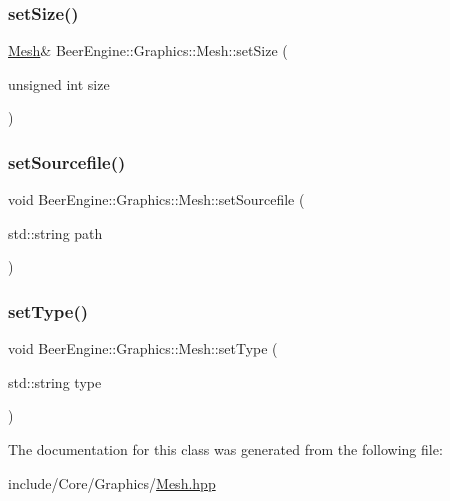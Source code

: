 \subsubsection{\texorpdfstring{set\+Size()}{setSize()}}
{\footnotesize\ttfamily \mbox{\hyperlink{class_beer_engine_1_1_graphics_1_1_mesh}{Mesh}}\& Beer\+Engine\+::\+Graphics\+::\+Mesh\+::set\+Size (\begin{DoxyParamCaption}\item[{unsigned int}]{size }\end{DoxyParamCaption})}

\mbox{\label{class_beer_engine_1_1_graphics_1_1_mesh_a9c0d91380cd84b6850e850ed9b4d61ed}} 
\subsubsection{\texorpdfstring{set\+Sourcefile()}{setSourcefile()}}
{\footnotesize\ttfamily void Beer\+Engine\+::\+Graphics\+::\+Mesh\+::set\+Sourcefile (\begin{DoxyParamCaption}\item[{std\+::string}]{path }\end{DoxyParamCaption})}

\mbox{\label{class_beer_engine_1_1_graphics_1_1_mesh_a296b58a337dab85843a69f1dced68125}} 
\subsubsection{\texorpdfstring{set\+Type()}{setType()}}
{\footnotesize\ttfamily void Beer\+Engine\+::\+Graphics\+::\+Mesh\+::set\+Type (\begin{DoxyParamCaption}\item[{std\+::string}]{type }\end{DoxyParamCaption})}



The documentation for this class was generated from the following file\+:\begin{DoxyCompactItemize}
\item 
include/\+Core/\+Graphics/\mbox{\hyperlink{_mesh_8hpp}{Mesh.\+hpp}}\end{DoxyCompactItemize}
